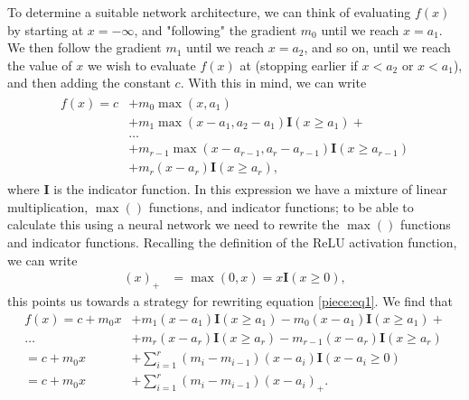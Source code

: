 \documentclass{somasmsc}
\begin{document}
To determine a suitable network architecture, we can think of evaluating $f\left(x\right)$ by starting at $x = -\infty$, and "following" the gradient $m_0$ until we reach $x = a_1$. We then follow the gradient $m_1$ until we reach $x = a_2$, and so on, until we reach the value of $x$ we wish to evaluate $f\left(x\right)$ at (stopping earlier if $x < a_2$ or $x < a_1$), and then adding the constant $c$. With this in mind, we can write
\begin{align}\label{piece:eq1}
\begin{split}
f\left(x\right) = c &+ m_0 \max\left(x, a_1\right) \\
&+ m_1 \max\left(x - a_1, a_2 - a_1\right) \mathbf{I}\left(x \geq a_1\right) + \\
&\dots \\
&+ m_{r-1} \max\left(x - a_{r-1}, a_r - a_{r-1}\right) \mathbf{I}\left(x \geq a_{r-1}\right) \\
&+ m_r \left(x - a_r\right) \mathbf{I}\left(x \geq a_r\right),
\end{split}
\end{align}
where $\mathbf{I}$ is the indicator function. In this expression we have a mixture of linear multiplication, $\max\left(\right)$ functions, and indicator functions; to be able to calculate this using a neural network we need to rewrite the $\max\left(\right)$ functions and indicator functions. Recalling the definition of the ReLU activation function, we can write
\begin{align*}
\left(x\right)_+ &= \max\left(0, x\right) = x \mathbf{I}\left(x \geq 0\right),
\end{align*}
this points us towards a strategy for rewriting equation \ref{piece:eq1}. We find that
\begin{align*}
f\left(x\right) = c + m_0 x &+ m_1 \left(x - a_1\right) \mathbf{I}\left(x \geq a_1\right) - m_0 \left(x - a_1\right) \mathbf{I}\left(x \geq a_1\right) + \\
\dots &+ m_r \left(x - a_r\right) \mathbf{I}\left(x \geq a_r\right) - m_{r-1} \left(x - a_r\right) \mathbf{I}\left(x \geq a_r\right) \\
= c + m_0 x &+ \sum_{i=1}^r \left(m_i - m_{i-1}\right) \left(x - a_i\right) \mathbf{I}\left(x - a_i \geq 0\right) \\
= c + m_0 x &+ \sum_{i=1}^r \left(m_i - m_{i-1}\right) \left(x - a_i\right)_+.
\end{align*}
\end{document}
